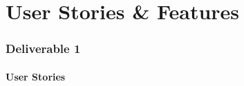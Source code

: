 \documentclass[12pt]{article}
\begin{document}
%

\setcounter{part}{1}
\setcounter{section}{1}
\setcounter{subsection}{0}
\part{User Stories \& Features}
\section*{Deliverable 1}
\subsection{User Stories}

\begin{framed}

\end{framed}
\end{document}
